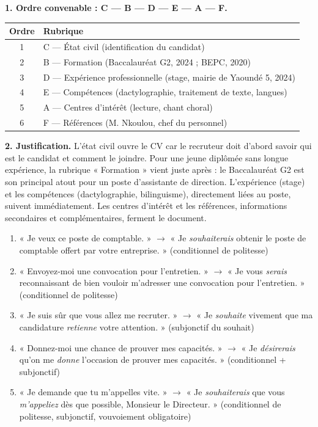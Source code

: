 \documentclass[11pt]{article}
\begin{document}
\begin{corrige}
\textbf{1. Ordre convenable : C — B — D — E — A — F.}

\begin{center}
\begin{tabular}{|c|l|}
\hline
Ordre & Rubrique \\
\hline
1 & C — État civil (identification du candidat) \\
2 & B — Formation (Baccalauréat G2, 2024 ; BEPC, 2020) \\
3 & D — Expérience professionnelle (stage, mairie de Yaoundé 5, 2024) \\
4 & E — Compétences (dactylographie, traitement de texte, langues) \\
5 & A — Centres d'intérêt (lecture, chant choral) \\
6 & F — Références (M. Nkoulou, chef du personnel) \\
\hline
\end{tabular}
\end{center}

\textbf{2. Justification.} L'état civil ouvre le CV car le recruteur doit d'abord savoir qui est le candidat et comment le joindre. Pour une jeune diplômée sans longue expérience, la rubrique « Formation » vient juste après : le Baccalauréat G2 est son principal atout pour un poste d'assistante de direction. L'expérience (stage) et les compétences (dactylographie, bilinguisme), directement liées au poste, suivent immédiatement. Les centres d'intérêt et les références, informations secondaires et complémentaires, ferment le document.
\end{corrige}

\begin{corrige}
\begin{enumerate}
\item « Je veux ce poste de comptable. » $\rightarrow$ « Je \emph{souhaiterais} obtenir le poste de comptable offert par votre entreprise. » (conditionnel de politesse)
\item « Envoyez-moi une convocation pour l'entretien. » $\rightarrow$ « Je vous \emph{serais} reconnaissant de bien vouloir m'adresser une convocation pour l'entretien. » (conditionnel de politesse)
\item « Je suis sûr que vous allez me recruter. » $\rightarrow$ « Je \emph{souhaite} vivement que ma candidature \emph{retienne} votre attention. » (subjonctif du souhait)
\item « Donnez-moi une chance de prouver mes capacités. » $\rightarrow$ « Je \emph{désirerais} qu'on me \emph{donne} l'occasion de prouver mes capacités. » (conditionnel + subjonctif)
\item « Je demande que tu m'appelles vite. » $\rightarrow$ « Je \emph{souhaiterais} que vous \emph{m'appeliez} dès que possible, Monsieur le Directeur. » (conditionnel de politesse, subjonctif, vouvoiement obligatoire)
\end{enumerate}
\end{corrige}
\end{document}

